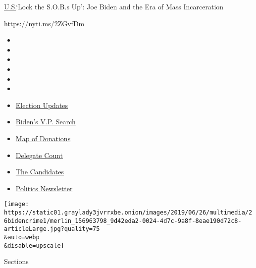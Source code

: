 \href{/section/us}{U.S.}\textbar{}`Lock the S.O.B.s Up': Joe Biden and
the Era of Mass Incarceration

\url{https://nyti.ms/2ZGvfDm}

\begin{itemize}
\item
\item
\item
\item
\item
\item
\end{itemize}

\begin{itemize}
\item
  \href{https://www.nytimes3xbfgragh.onion/2020/08/04/us/elections/primary-election-michigan-arizona-kansas.html?action=click\&pgtype=Article\&state=default\&region=TOP_BANNER\&context=storylines_menu}{Election
  Updates}
\item
  \href{https://www.nytimes3xbfgragh.onion/article/biden-vice-president-2020.html?action=click\&pgtype=Article\&state=default\&region=TOP_BANNER\&context=storylines_menu}{Biden's
  V.P. Search}
\item
  \href{https://www.nytimes3xbfgragh.onion/interactive/2020/07/24/us/politics/trump-biden-campaign-donors.html?action=click\&pgtype=Article\&state=default\&region=TOP_BANNER\&context=storylines_menu}{Map
  of Donations}
\item
  \href{https://www.nytimes3xbfgragh.onion/interactive/2020/us/elections/delegate-count-primary-results.html?action=click\&pgtype=Article\&state=default\&region=TOP_BANNER\&context=storylines_menu}{Delegate
  Count}
\item
  \href{https://www.nytimes3xbfgragh.onion/interactive/2019/us/politics/2020-presidential-candidates.html?action=click\&pgtype=Article\&state=default\&region=TOP_BANNER\&context=storylines_menu}{The
  Candidates}
\item
  \href{https://www.nytimes3xbfgragh.onion/newsletters/politics?action=click\&pgtype=Article\&state=default\&region=TOP_BANNER\&context=storylines_menu}{Politics
  Newsletter}
\end{itemize}

\texttt{[image: https://static01.graylady3jvrrxbe.onion/images/2019/06/26/multimedia/26bidencrime1/merlin\_156963798\_9d42eda2-0024-4d7c-9a8f-8eae190d72c8-articleLarge.jpg?quality=75\\\&auto=webp\\\&disable=upscale]}

Sections

